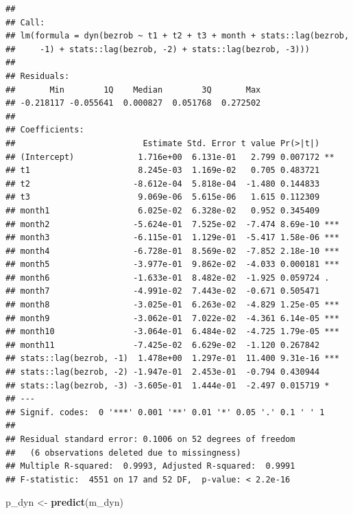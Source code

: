 \documentclass[polish,]{book}
\newenvironment{Shaded}{\begin{snugshade}}{\end{snugshade}}
\newcommand{\KeywordTok}[1]{\textcolor[rgb]{0.13,0.29,0.53}{\textbf{#1}}}
\newcommand{\NormalTok}[1]{#1}
\newcommand{\StringTok}[1]{\textcolor[rgb]{0.31,0.60,0.02}{#1}}
\begin{document}
\begin{verbatim}
## 
## Call:
## lm(formula = dyn(bezrob ~ t1 + t2 + t3 + month + stats::lag(bezrob, 
##     -1) + stats::lag(bezrob, -2) + stats::lag(bezrob, -3)))
## 
## Residuals:
##       Min        1Q    Median        3Q       Max 
## -0.218117 -0.055641  0.000827  0.051768  0.272502 
## 
## Coefficients:
##                          Estimate Std. Error t value Pr(>|t|)    
## (Intercept)             1.716e+00  6.131e-01   2.799 0.007172 ** 
## t1                      8.245e-03  1.169e-02   0.705 0.483721    
## t2                     -8.612e-04  5.818e-04  -1.480 0.144833    
## t3                      9.069e-06  5.615e-06   1.615 0.112309    
## month1                  6.025e-02  6.328e-02   0.952 0.345409    
## month2                 -5.624e-01  7.525e-02  -7.474 8.69e-10 ***
## month3                 -6.115e-01  1.129e-01  -5.417 1.58e-06 ***
## month4                 -6.728e-01  8.569e-02  -7.852 2.18e-10 ***
## month5                 -3.977e-01  9.862e-02  -4.033 0.000181 ***
## month6                 -1.633e-01  8.482e-02  -1.925 0.059724 .  
## month7                 -4.991e-02  7.443e-02  -0.671 0.505471    
## month8                 -3.025e-01  6.263e-02  -4.829 1.25e-05 ***
## month9                 -3.062e-01  7.022e-02  -4.361 6.14e-05 ***
## month10                -3.064e-01  6.484e-02  -4.725 1.79e-05 ***
## month11                -7.425e-02  6.629e-02  -1.120 0.267842    
## stats::lag(bezrob, -1)  1.478e+00  1.297e-01  11.400 9.31e-16 ***
## stats::lag(bezrob, -2) -1.947e-01  2.453e-01  -0.794 0.430944    
## stats::lag(bezrob, -3) -3.605e-01  1.444e-01  -2.497 0.015719 *  
## ---
## Signif. codes:  0 '***' 0.001 '**' 0.01 '*' 0.05 '.' 0.1 ' ' 1
## 
## Residual standard error: 0.1006 on 52 degrees of freedom
##   (6 observations deleted due to missingness)
## Multiple R-squared:  0.9993, Adjusted R-squared:  0.9991 
## F-statistic:  4551 on 17 and 52 DF,  p-value: < 2.2e-16
\end{verbatim}

\begin{Shaded}
\begin{Highlighting}[]
\NormalTok{p_dyn <-}\StringTok{ }\KeywordTok{predict}\NormalTok{(m_dyn)}
\end{Highlighting}
\end{Shaded}
\end{document}
